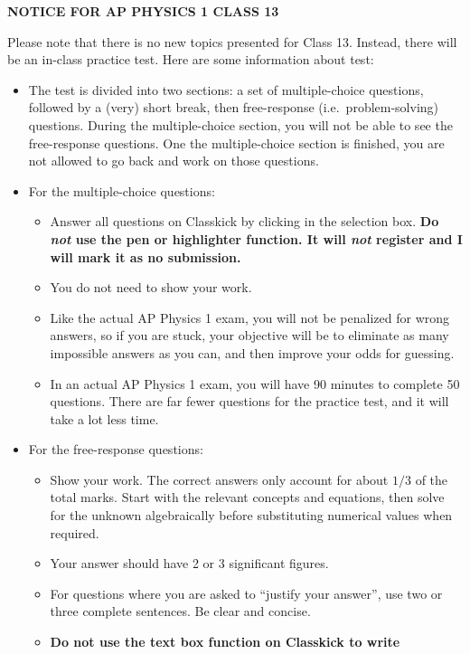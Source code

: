 \documentclass[letterpaper,11pt]{article}
\begin{document}
\begin{center}
  \Large\textbf{NOTICE FOR AP PHYSICS 1 CLASS 13}
\end{center}
Please note that there is no new topics presented for Class 13. Instead, there
will be an in-class practice test. Here are some information about test:
\begin{itemize}[leftmargin=18pt]
\item The test is divided into two sections: a set of multiple-choice
  questions, followed by a (very) short break, then free-response (i.e.\
  problem-solving) questions. During the multiple-choice section, you will not
  be able to see the free-response questions. One the multiple-choice section is
  finished, you are not allowed to go back and work on those questions. 
\item For the multiple-choice questions:
  \begin{itemize}[leftmargin=20pt]
  \item Answer all questions on Classkick by clicking in the selection box.
    \textbf{Do \emph{not} use the pen or highlighter function. It will
      \emph{not} register and I will mark it as no submission.}
  \item You do not need to show your work.
  \item Like the actual AP Physics 1 exam, you will not be penalized for wrong
    answers, so if you are stuck, your objective will be to eliminate as many
    impossible answers as you can, and then improve your odds for guessing.
  \item In an actual AP Physics 1 exam, you will have 90 minutes to complete 50
    questions. There are far fewer questions for the practice test, and it will
    take a lot less time.
  \end{itemize}
\item For the free-response questions:
  \begin{itemize}[leftmargin=20pt]
  \item Show your work. The correct answers only account for about $1/3$ of the
    total marks. Start with the relevant concepts and equations, then solve for
    the unknown algebraically before substituting numerical values when
    required.
  \item Your answer should have 2 or 3 significant figures.
  \item For questions where you are asked to ``justify your answer'', use two
    or three complete sentences. Be clear and concise.
  \item \textbf{Do not use the text box function on Classkick to write
}
\end{itemize}
\end{itemize}
\end{document}
